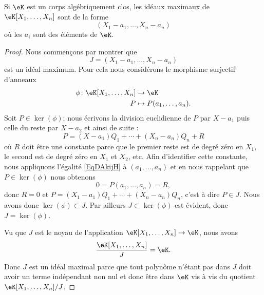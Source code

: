 \begin{theorem}  \label{ThowgZYqx}
    Si \( \eK\) est un corps algébriquement clos, les idéaux maximaux de \( \eK[X_1,\ldots, X_n]\) sont de la forme
    \begin{equation}
        (X_1-a_1,\ldots, X_n-a_n)
    \end{equation}
    où les \( a_i\) sont des éléments de \( \eK\).
\end{theorem}

\begin{proof}
    Nous commençons par montrer que
    \begin{equation}
        J=(X_1-a_1,\ldots, X_n-a_n)
    \end{equation}
    est un idéal maximum. Pour cela nous considérons le morphisme surjectif d'anneaux
    \begin{equation}
        \begin{aligned}
            \phi\colon \eK[X_1,\ldots, X_n]&\to \eK \\
            P&\mapsto P(a_1,\ldots, a_n). 
        \end{aligned}
    \end{equation}
    Soit \( P\in\ker(\phi)\); nous écrivons la division euclidienne de \( P\) par \( X-a_1\) puis celle du reste par \( X-a_2\) et ainsi de suite :
    \begin{equation}    \label{EqDAkijH}
        P=(X-a_1)Q_1+\cdots +(X_n-a_n)Q_n+R
    \end{equation}
    où \( R\) doit être une constante parce que le premier reste est de degré zéro en \( X_1\), le second est de degré zéro en \( X_1\) et \( X_2\), etc. Afin d'identifier cette constante, nous appliquons l'égalité \eqref{EqDAkijH} à \( (a_1,\ldots, a_n)\) et en nous rappelant que \( P\in \ker(\phi)\) nous obtenons
    \begin{equation}
        0=P(a_1,\ldots, a_n)=R,
    \end{equation}
    donc \( R=0\) et \( P=(X_1-a_1)Q_1+\cdots +(X_n-a_n)Q_n\), c'est à dire \( P\in J\). Nous avons donc \( \ker(\phi)\subset J\). Par ailleurs \( J\subset \ker(\phi)\) est évident, donc \( J=\ker(\phi)\).

    Vu que \( J\) est le noyau de l'application \( \eK[X_1,\ldots, X_n]\to \eK\), nous avons 
    \begin{equation}
        \frac{ \eK[X_1,\ldots, X_n] }{ J }=\eK.
    \end{equation}
    Donc \( J\) est un idéal maximal parce que tout polynôme n'étant pas dans \( J\) doit avoir un terme indépendant non nul et donc être dans \( \eK\) vis à vis du quotient \( \eK[X_1,\ldots, X_n]/J\).


\end{proof}
